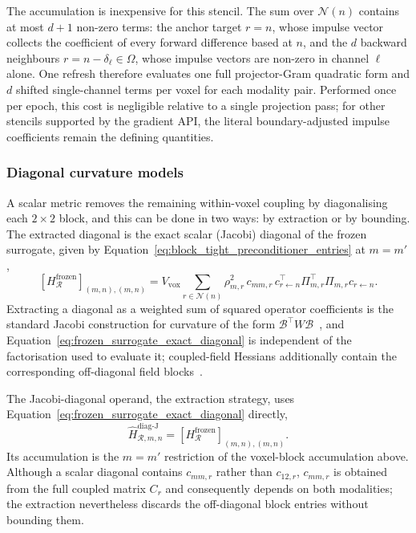 The accumulation is inexpensive for this stencil. The sum over $\mathcal{N}(n)$ contains at most $d+1$ non-zero terms: the anchor target $r=n$, whose impulse vector collects the coefficient of every forward difference based at $n$, and the $d$ backward neighbours $r=n-\delta_\ell\in\Omega$, whose impulse vectors are non-zero in channel $\ell$ alone. One refresh therefore evaluates one full projector-Gram quadratic form and $d$ shifted single-channel terms per voxel for each modality pair. Performed once per epoch, this cost is negligible relative to a single projection pass; for other stencils supported by the gradient API, the literal boundary-adjusted impulse coefficients remain the defining quantities.

\subsubsection{Diagonal curvature models}

A scalar metric removes the remaining within-voxel coupling by diagonalising each $2\times2$ block, and this can be done in two ways: by extraction or by bounding. The extracted diagonal is the exact scalar (Jacobi) diagonal of the frozen  surrogate, given by Equation~\eqref{eq:block_tight_preconditioner_entries} at $m=m'$,
\begin{equation}
    \left[H_{\mathcal R}^{\mathrm{frozen}}\right]_{(m,n),(m,n)}
    =
    V_{\mathrm{vox}}
    \sum_{r\in\mathcal{N}(n)}
    \rho_{m,r}^{2}\,c_{mm,r}\,
    c_{r\leftarrow n}^{\top}
    \Pi_{m,r}^{\top}\Pi_{m,r}
    c_{r\leftarrow n}.
    \label{eq:frozen_surrogate_exact_diagonal}
\end{equation}
Extracting a diagonal as a weighted sum of squared operator coefficients is the standard Jacobi construction for curvature of the form $\mathcal B^\top W\mathcal B$~\cite{fessler_conjugate-gradient_1999, sotthivirat_image_2002}, and Equation~\eqref{eq:frozen_surrogate_exact_diagonal} is independent of the factorisation used to evaluate it; coupled-field Hessians additionally contain the corresponding off-diagonal field blocks~\cite{crestel_comparative_2018}.

The  Jacobi-diagonal operand, the extraction strategy, uses Equation~\eqref{eq:frozen_surrogate_exact_diagonal} directly,
\begin{equation}
    \widehat H_{\mathcal R,m,n}^{\mathrm{diag\text{-}J}}
    =
    \left[H_{\mathcal R}^{\mathrm{frozen}}\right]_{(m,n),(m,n)}.
    \label{eq:diag_tight_preconditioner}
\end{equation}
Its accumulation is the $m=m'$ restriction of the voxel-block accumulation above. Although a scalar diagonal contains $c_{mm,r}$ rather than $c_{12,r}$, $c_{mm,r}$ is obtained from the full coupled matrix $C_r$ and consequently depends on both modalities; the extraction nevertheless discards the off-diagonal block entries without bounding them.

